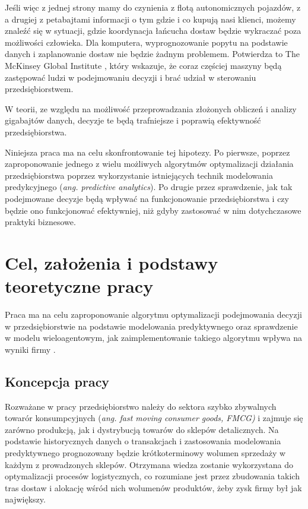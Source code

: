 \documentclass[polish, twoside, 12pt, a4paper]{article}
\theoremstyle{definition}
\theoremstyle{plain}
\theoremstyle{remark}
\begin{document}
Jeśli więc z jednej strony mamy do czynienia z flotą autonomicznych pojazdów, z a drugiej z petabajtami informacji o tym gdzie i co kupują nasi klienci, możemy znaleźć się w sytuacji, gdzie koordynacja łańcucha dostaw będzie wykraczać poza możliwości człowieka. Dla komputera, wyprognozowanie popytu na podstawie danych i zaplanowanie dostaw nie będzie żadnym problemem. Potwierdza to The McKinsey Global Institute \cite{McKinsey2011}, który wskazuje, że coraz częściej maszyny będą zastępować ludzi w podejmowaniu decyzji i brać udział w sterowaniu przedsiębiorstwem. 

W teorii, ze względu na możliwość przeprowadzania złożonych obliczeń i analizy gigabajtów danych, decyzje te będą trafniejsze i poprawią efektywność przedsiębiorstwa. 

Niniejsza praca ma na celu skonfrontowanie tej hipotezy. Po pierwsze, poprzez zaproponowanie jednego z wielu możliwych algorytmów optymalizacji działania przedsiębiorstwa poprzez wykorzystanie istniejących technik modelowania predykcyjnego (\textit{ang. predictive analytics}). Po drugie przez sprawdzenie, jak tak podejmowane decyzje będą wpływać na funkcjonowanie przedsiębiorstwa i czy będzie ono funkcjonować efektywniej, niż gdyby zastosować w nim dotychczasowe praktyki biznesowe.


\clearpage

\section{Cel, założenia i podstawy teoretyczne pracy}

Praca ma na celu zaproponowanie algorytmu optymalizacji podejmowania decyzji w przedsiębiorstwie na podstawie modelowania predyktywnego oraz sprawdzenie w modelu wieloagentowym, jak zaimplementowanie takiego algorytmu wpływa na wyniki firmy .  

\subsection{Koncepcja pracy}

Rozważane w pracy przedsiębiorstwo należy do sektora szybko zbywalnych towarór konsumpcyjnych (\textit{ang. fast moving consumer goods, FMCG)} i zajmuje się zarówno produkcją, jak i dystrybucją towarów do sklepów detalicznych. Na podstawie historycznych danych o transakcjach i zastosowania modelowania predyktywnego prognozowany będzie krótkoterminowy wolumen sprzedaży w każdym z prowadzonych sklepów. Otrzymana wiedza zostanie wykorzystana do optymalizacji procesów logistycznych, co rozumiane jest przez zbudowania takich tras dostaw i alokację wśród nich wolumenów produktów, żeby zysk firmy był jak największy. 
\end{document}
